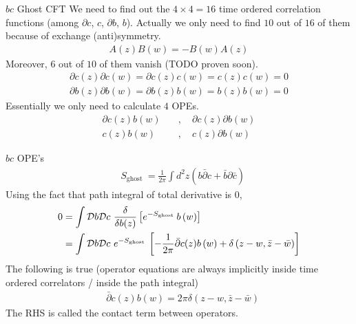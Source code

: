\documentclass{beamer}
\begin{document}
\begin{frame}{$bc$ Ghost CFT}
    We need to find out the $4\times 4=16$ time ordered correlation functions (among $\partial c$, $c$, $\partial b$, $b$). Actually we only need to find $10$ out of $16$ of them because of exchange (anti)symmetry. 
    \begin{align}
        A(z)B(w) = - B(w)A(z)
    \end{align}
    Moreover, $6$ out of $10$ of them vanish (TODO proven soon).
    \begin{align}
        \partial c(z) \partial c(w) = \partial c(z) c(w) = c(z)c(w) = 0\\
        \partial b(z) \partial b(w) = \partial b(z) b(w) = b(z)b(w) = 0
    \end{align}
    Essentially we only need to calculate $4$ OPEs.
    \begin{align}
        \partial c(z) b(w) \quad&,\quad \partial c(z) \partial b(w)\\
        c(z) b(w) \quad&,\quad c(z) \partial b(w)
    \end{align}
\end{frame}
\begin{frame}{$bc$ OPE's}
    \begin{align}
    &S_{\text {ghost }}=\frac{1}{2 \pi} \int d^2 z(b \bar{\partial} c+\bar{b} \partial \bar{c})
    \end{align}
    Using the fact that path integral of total derivative is $0$,
    \begin{align}
        0&=\int \mathcal{D} b \mathcal{D} c\ \frac{\delta}{\delta b(z)}\left[e^{-S_{\text {ghost }}} b\left(w\right)\right]\\&=\int \mathcal{D} b \mathcal{D} c\ e^{-S_{\text {ghost }}}\left[-\frac{1}{2 \pi} \bar{\partial} c(z) b\left(w\right)+\delta\left(z-w, \bar z - \bar w \right)\right] \notag
    \end{align}
    The following is true (operator equations are always implicitly inside time ordered correlators / inside the path integral)
    \begin{align}
        &\bar{\partial} c(z) b\left(w\right)=2\pi \delta\left(z-w,\bar z - \bar w \right)
    \end{align}
    The RHS is called the contact term between operators.
\end{frame}
\end{document}
